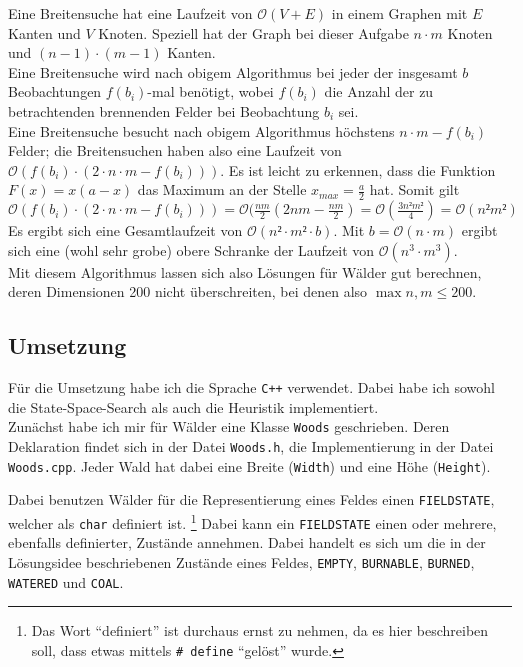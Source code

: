 Eine Breitensuche hat eine Laufzeit von $\mathcal{O}(V + E)$ in einem Graphen mit $E$ Kanten und $V$ Knoten. Speziell hat der Graph bei dieser Aufgabe $n\cdot m$ Knoten und $(n-1)\cdot (m-1)$ Kanten.\\
Eine Breitensuche wird nach obigem Algorithmus bei jeder der insgesamt $b$ Beobachtungen $f(b_i)$-mal benötigt, wobei $f(b_i)$ die Anzahl der zu betrachtenden brennenden Felder bei Beobachtung $b_i$ sei.\\
Eine Breitensuche besucht nach obigem Algorithmus höchstens $n\cdot m - f(b_i)$ Felder; die Breitensuchen haben also eine Laufzeit von $\mathcal{O}(f(b_i)\cdot (2\cdot n\cdot m - f(b_i)))$. Es ist leicht zu erkennen, dass die Funktion $F(x) = x(a-x)$ das Maximum an der Stelle $x_{max} = \frac{a}{2}$ hat. Somit gilt $\mathcal{O}(f(b_i)\cdot (2\cdot n\cdot m - f(b_i))) = \mathcal{O}(\frac{nm}{2}(2nm - \frac{nm}{2}) = \mathcal{O}(\frac{3n²m²}{4}) = \mathcal{O}(n²m²)$
 Es ergibt sich eine Gesamtlaufzeit von $\mathcal{O}(n²\cdot m² \cdot b)$. Mit $b = \mathcal{O}(n\cdot m)$ ergibt sich eine (wohl sehr grobe) obere Schranke der Laufzeit von $\mathcal{O}(n^3 \cdot m^3)$.\\
Mit diesem Algorithmus lassen sich also Lösungen für Wälder gut berechnen, deren Dimensionen 200 nicht überschreiten, bei denen also $\max{n,m} \leq 200$.


\subsection{Umsetzung}
Für die Umsetzung habe ich die Sprache \texttt{C++} verwendet. Dabei habe ich sowohl die State-Space-Search als auch die Heuristik implementiert.\\
Zunächst habe ich mir für Wälder eine Klasse \texttt{Woods} geschrieben. Deren Deklaration findet sich in der Datei \texttt{Woods.h}, die Implementierung in der Datei \texttt{Woods.cpp}. Jeder Wald hat dabei eine Breite (\texttt{Width}) und eine Höhe (\texttt{Height}).

Dabei benutzen Wälder für die Representierung eines Feldes einen \texttt{FIELDSTATE}, welcher als \texttt{char} definiert ist. \footnote{Das Wort \enquote{definiert} ist durchaus ernst zu nehmen, da es hier beschreiben soll, dass etwas mittels \texttt{\# define} \enquote{gelöst} wurde.} Dabei kann ein \texttt{FIELDSTATE} einen oder mehrere, ebenfalls definierter, Zustände annehmen. Dabei handelt es sich um die in der Lösungsidee beschriebenen Zustände eines Feldes, \texttt{EMPTY}, \texttt{BURNABLE}, \texttt{BURNED}, \texttt{WATERED} und \texttt{COAL}.\\

